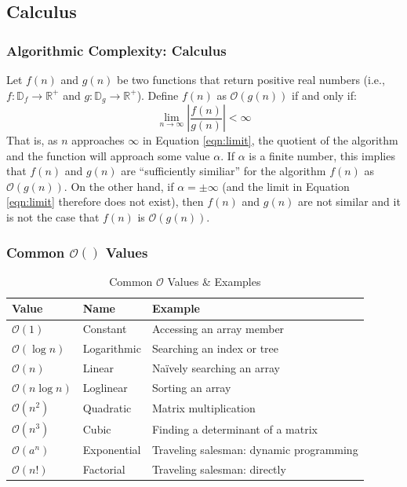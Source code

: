\documentclass[aspectratio=169]{beamer}
\begin{document}
\subsection{Calculus}
\begin{frame}
\frametitle{Algorithmic Complexity: Calculus}
Let $f(n)$ and $g(n)$ be two functions that return positive real numbers (i.e., $f : \mathbb{D}_f \rightarrow \mathbb{R}^+$ and $g : \mathbb{D}_g \rightarrow \mathbb{R}^+$). Define $f(n)$ as $\mathcal{O}(g(n))$ if and only if:
\begin{equation}
\lim_{n \rightarrow \infty} \left| \frac{f(n)}{g(n)}\right| < \infty
\label{eqn:limit}
\end{equation}
That is, as $n$ approaches $\infty$ in Equation \ref{eqn:limit}, the quotient of the algorithm and the function will approach some value $\alpha$. If $\alpha$ is a finite number, this implies that $f(n)$ and $g(n)$ are ``sufficiently similiar'' for the algorithm $f(n)$ as $\mathcal{O}(g(n))$. On the other hand, if $\alpha = \pm \infty$ (and the limit in Equation \ref{eqn:limit} therefore does not exist), then $f(n)$ and $g(n)$ are not similar and it is not the case that $f(n)$ is $\mathcal{O}(g(n))$.
\end{frame}

\begin{frame}
\frametitle{Common $\mathcal{O}()$ Values}
\begin{table}
\begin{tabular}{|l|l|l|}
\hline
\textbf{Value} & \textbf{Name} & \textbf{Example}\\
\hline
$\mathcal{O}(1)$ & Constant & Accessing an array member\\
\hline
$\mathcal{O}(\log n)$ & Logarithmic & Searching an index or tree\\
\hline
$\mathcal{O}(n)$ & Linear & Na\"{i}vely searching an array\\
\hline
$\mathcal{O}(n \log n)$ & Loglinear & Sorting an array\\
\hline
$\mathcal{O}(n^2)$ & Quadratic &  Matrix multiplication\\
\hline
$\mathcal{O}(n^3)$ & Cubic & Finding a determinant of a matrix\\
\hline
$\mathcal{O}(a^n)$ & Exponential & Traveling salesman: dynamic programming\\
\hline
$\mathcal{O}(n!)$ & Factorial & Traveling salesman: directly\\
\hline
\end{tabular}
\caption{Common $\mathcal{O}$ Values \& Examples}
\label{tbl:values}
\end{table}
\end{frame}
\end{document}
